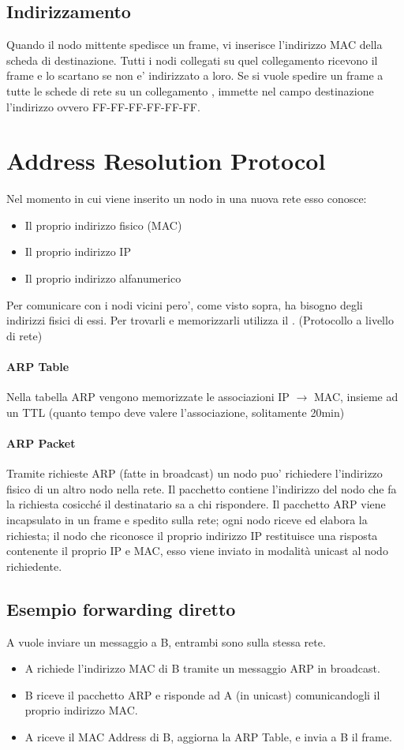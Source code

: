 \subsection{Indirizzamento}
Quando il nodo mittente spedisce un frame, vi inserisce l'indirizzo MAC della scheda di destinazione. Tutti i nodi collegati su quel collegamento ricevono il frame e lo scartano se non e' indirizzato a loro. Se si vuole spedire un frame a tutte le schede di rete su un collegamento , immette nel campo destinazione l'indirizzo  ovvero FF-FF-FF-FF-FF-FF.
\section{Address Resolution Protocol}
Nel momento in cui viene inserito un nodo in una nuova rete esso conosce:
\begin{itemize}
    \item Il proprio indirizzo fisico (MAC)
    \item Il proprio indirizzo IP
    \item Il proprio indirizzo alfanumerico
\end{itemize}
Per comunicare con i nodi vicini pero', come visto sopra, ha bisogno degli indirizzi fisici di essi.
Per trovarli e memorizzarli utilizza il . (Protocollo a livello di rete)
\paragraph{ARP Table}
Nella tabella ARP vengono memorizzate le associazioni IP $\rightarrow$ MAC, insieme ad un TTL (quanto tempo deve valere l'associazione, solitamente 20min)
\paragraph{ARP Packet}
Tramite richieste ARP (fatte in broadcast) un nodo puo' richiedere l'indirizzo fisico di un altro nodo nella rete. Il pacchetto contiene l'indirizzo del nodo che fa la richiesta cosicché il destinatario sa a chi rispondere.
Il pacchetto ARP viene incapsulato in un frame e spedito sulla rete; ogni nodo riceve ed elabora la richiesta; il nodo che riconosce il proprio indirizzo IP restituisce una risposta contenente il proprio IP e MAC, esso viene inviato in modalità unicast al nodo richiedente.
\subsection{Esempio forwarding diretto}
A vuole inviare un messaggio a B, entrambi sono sulla stessa rete.
\begin{itemize}
    \item A richiede l'indirizzo MAC di B tramite un messaggio ARP in broadcast.
    \item B riceve il pacchetto ARP e risponde ad A (in unicast) comunicandogli il proprio indirizzo MAC.
    \item A riceve il MAC Address di B, aggiorna la ARP Table, e invia a B il frame.
\end{itemize}
